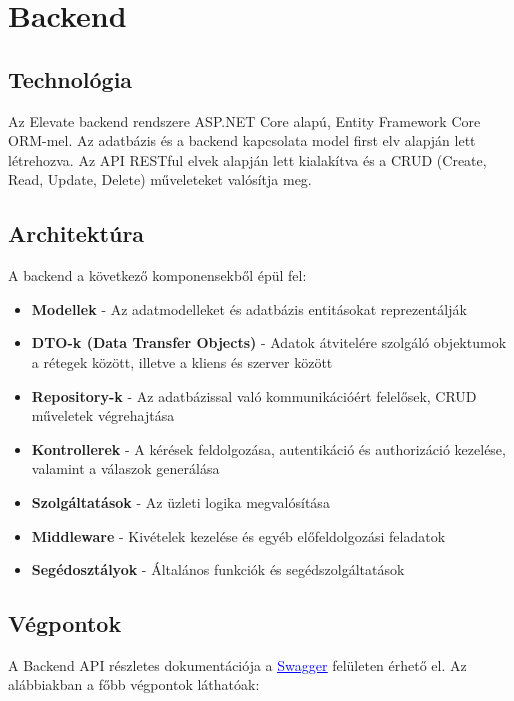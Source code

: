 \documentclass[12pt]{report}
\begin{document}
\chapter{Backend}

\section{Technológia}
Az Elevate backend rendszere ASP.NET Core alapú, Entity Framework Core ORM-mel. Az adatbázis és a backend kapcsolata model first elv alapján lett létrehozva. Az API RESTful elvek alapján lett kialakítva és a CRUD (Create, Read, Update, Delete) műveleteket valósítja meg.

\section{Architektúra}
A backend a következő komponensekből épül fel:
\begin{itemize}
  \item \textbf{Modellek} - Az adatmodelleket és adatbázis entitásokat reprezentálják
  \item \textbf{DTO-k (Data Transfer Objects)} - Adatok átvitelére szolgáló objektumok a rétegek között, illetve a kliens és szerver között
  \item \textbf{Repository-k} - Az adatbázissal való kommunikációért felelősek, CRUD műveletek végrehajtása
  \item \textbf{Kontrollerek} - A kérések feldolgozása, autentikáció és authorizáció kezelése, valamint a válaszok generálása
  \item \textbf{Szolgáltatások} - Az üzleti logika megvalósítása
  \item \textbf{Middleware} - Kivételek kezelése és egyéb előfeldolgozási feladatok
  \item \textbf{Segédosztályok} - Általános funkciók és segédszolgáltatások
\end{itemize}

\section{Végpontok}
A Backend API részletes dokumentációja a \href{https://swagger.io/}{\textcolor{blue}{\underline{Swagger}}} felületen érhető el. Az alábbiakban a főbb végpontok láthatóak:
\end{document}
